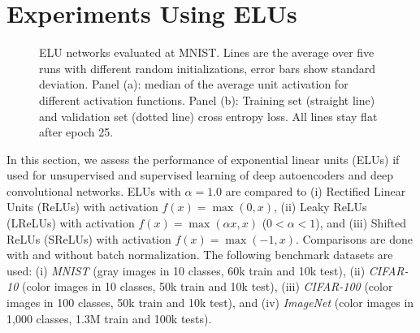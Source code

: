 \documentclass{article}
\begin{document}
\section{Experiments Using ELUs}
\label{sec:exp}
\begin{figure}[!ht]
\begin{center}
\end{center}
\caption{ELU networks evaluated at MNIST. Lines are
the average over five runs with different random initializations, error
bars show standard deviation.
Panel (a): median of the average unit activation for different
activation functions.
Panel (b): Training set (straight line) and validation set (dotted line)
 cross entropy loss. All lines stay flat after epoch 25.
\label{fig:mnistplots}}
\end{figure}

In this section, we assess the performance of exponential linear units (ELUs)
if used for unsupervised and supervised learning of deep autoencoders and
deep convolutional networks. ELUs with $\alpha=1.0$  are compared to
(i) Rectified Linear Units (ReLUs) with activation $f(x)=\max(0,x)$,
(ii) Leaky ReLUs (LReLUs) with activation $f(x)=\max(\alpha x,x)$ ($0<\alpha<1$), and
(iii) Shifted ReLUs (SReLUs) with activation $f(x)=\max(-1,x)$.
Comparisons are done with and without batch normalization.
The following benchmark datasets are used:
(i) {\em MNIST} (gray images in 10 classes, 60k train and 10k test),
(ii) {\em CIFAR-10} (color images in 10 classes, 50k train and 10k test),
(iii) {\em CIFAR-100} (color images in 100 classes, 50k train and 10k test), and
(iv) {\em ImageNet} (color images in 1,000 classes, 1.3M train and 100k tests).
\end{document}
